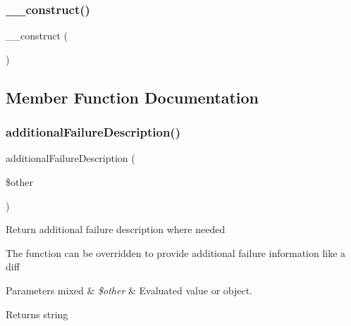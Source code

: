 \subsubsection{\texorpdfstring{\+\_\+\+\_\+construct()}{\_\_construct()}}
{\footnotesize\ttfamily \+\_\+\+\_\+construct (\begin{DoxyParamCaption}{ }\end{DoxyParamCaption})}



\subsection{Member Function Documentation}
\mbox{\label{class_p_h_p_unit___framework___constraint_ac90d1ef6c5737c595b1a8b1f3d3b230b}} 
\subsubsection{\texorpdfstring{additional\+Failure\+Description()}{additionalFailureDescription()}}
{\footnotesize\ttfamily additional\+Failure\+Description (\begin{DoxyParamCaption}\item[{}]{\$other }\end{DoxyParamCaption})\hspace{0.3cm}{\ttfamily [protected]}}

Return additional failure description where needed

The function can be overridden to provide additional failure information like a diff


\begin{DoxyParams}[1]{Parameters}
mixed & {\em \$other} & Evaluated value or object.\\
\hline
\end{DoxyParams}
\begin{DoxyReturn}{Returns}
string 
\end{DoxyReturn}
\mbox{\label{class_p_h_p_unit___framework___constraint_ac751e87b3d4c4bf2feb03bee8b092755}} 

